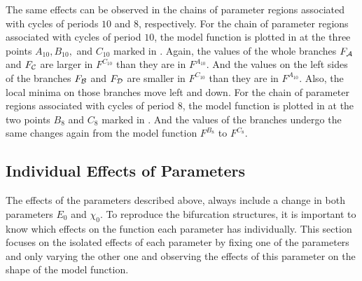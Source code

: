The same effects can be observed in the chains of parameter regions associated with cycles of periods $10$ and $8$, respectively.
For the chain of parameter regions associated with cycles of period $10$, the model function is plotted in  at the three points $A_{10}, B_{10},$ and $C_{10}$ marked in .
Again, the values of the whole branches $F_{\mathcal{A}}$ and $F_{\mathcal{C}}$ are larger in $F^{C_{10}}$ than they are in $F^{A_{10}}$.
And the values on the left sides of the branches $F_{\mathcal{B}}$ and $F_{\mathcal{D}}$ are smaller in $F^{C_{10}}$ than they are in $F^{A_{10}}$.
Also, the local minima on those branches move left and down.
For the chain of parameter regions associated with cycles of period $8$, the model function is plotted in  at the two points $B_8$ and $C_8$ marked in .
And the values of the branches undergo the same changes again from the model function $F^{B_8}$ to $F^{C_8}$.

\subsection{Individual Effects of Parameters}
\label{sec:setup.char.paramfx.individual}

The effects of the parameters described above, always include a change in both parameters $E_0$ and $\chi_0$.
To reproduce the bifurcation structures, it is important to know which effects on the function each parameter has individually.
This section focuses on the isolated effects of each parameter by fixing one of the parameters and only varying the other one and observing the effects of this parameter on the shape of the model function.

